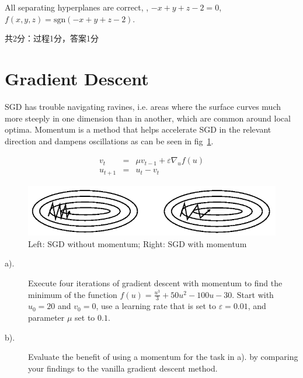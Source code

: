 \documentclass[12pt]{article}
\begin{document}
All separating hyperplanes are correct, \eg, $-x+y+z-2=0$, $f(x,y,z)=\mathrm{sgn}(-x+y+z-2)$.

共2分：过程1分，答案1分



\newpage
\section{Gradient Descent}
SGD has trouble navigating ravines, i.e. areas where the surface curves much more steeply in one dimension than in another, which are common around local optima. Momentum is a method that helps accelerate SGD in the relevant direction and dampens oscillations as can be seen in fig~\ref{fig:momentum}.

\begin{eqnarray}
	v_t & = & \mu v_{t-1} + \varepsilon \nabla_u f(u) \label{eq:1} \\
	u_{t+1} & =& u_{t} - v_t \label{eq:2}
\end{eqnarray}

\begin{figure}[!htbp]
	\centering
	\includegraphics[width=.7\textwidth]{fig/2018-03-19-13-38-08.png}
	\caption{Left: SGD without momentum; Right: SGD with momentum} \label{fig:momentum}
\end{figure}

\begin{description}
	\item[a).] Execute four iterations of gradient descent with momentum to find the minimum of
	      the function $f(u) = \frac{u^3}{3} + 50 u^2-100u-30$. Start with $u_0 = 20$ and $v_0=0$, use a learning rate
	      that is set to $\varepsilon = 0.01$, and parameter $\mu$ set to $0.1$.
	\item[b).] Evaluate the benefit of using a momentum for the task in a). by comparing your
	      findings to the vanilla gradient descent method.
\end{description}
\end{document}
